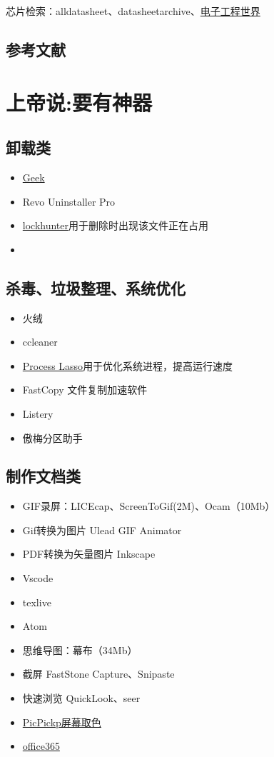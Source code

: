 \documentclass[UTF8,oneside]{ctexbook}
\begin{document}
芯片检索：alldatasheet、datasheetarchive、\href{http:\\datasheet.eeworld.com.cn}{电子工程世界}


\section{参考文献}


\chapter{上帝说:要有神器}
\section{卸载类}
\begin{itemize}
	\item \href{https://geekuninstaller.com/download}{Geek}
	\item Revo Uninstaller Pro
	\item \href{https://lockhunter.com}{lockhunter}用于删除时出现该文件正在占用
	\item 
\end{itemize}

\section{杀毒、垃圾整理、系统优化}
\begin{itemize}
	\item 火绒
	\item ccleaner
	\item \href{https://bitsum.com}{Process Lasso}用于优化系统进程，提高运行速度
	\item FastCopy 文件复制加速软件
	\item Listery
	\item 傲梅分区助手
\end{itemize}

\section{制作文档类}
\begin{itemize}
	\item GIF录屏：LICEcap、ScreenToGif(2M)、Ocam（10Mb）
	\item Gif转换为图片 Ulead GIF Animator
	\item PDF转换为矢量图片 Inkscape
	\item Vscode
	\item texlive
	\item Atom
	\item 思维导图：幕布（34Mb）
	\item 截屏 FastStone Capture、Snipaste
	\item 快速浏览 QuickLook、seer
	\item \href{https://picpick.app/zh/}{PicPickp屏幕取色}
	\item \href{https://otp.landian.vip/zh-cn/}{office365}
\end{itemize}
\end{document}

